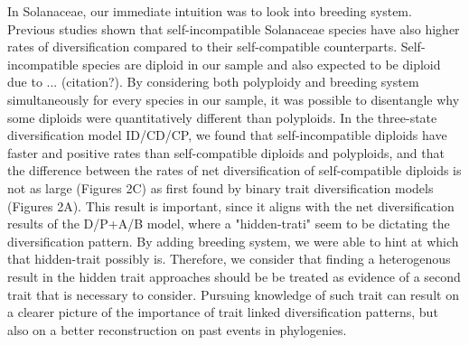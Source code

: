 In Solanaceae, our immediate intuition was to look into breeding system. Previous studies shown that self-incompatible Solanaceae species have also higher rates of diversification compared to their self-compatible counterparts. Self-incompatible species are diploid in our sample and also expected to be diploid due to ... (citation?). By considering both polyploidy and breeding system simultaneously for every species in our sample, it was possible to disentangle why some diploids were quantitatively different than polyploids. In the three-state diversification model ID/CD/CP, we found that self-incompatible diploids have faster and positive rates than self-compatible diploids and polyploids, and that the difference between the  rates of net diversification of self-compatible diploids is not as large (Figures 2C) as first found by binary trait diversification models (Figures 2A). This result is important, since it aligns with the net diversification results of the  D/P+A/B model, where a "hidden-trati" seem to be dictating the diversification pattern. By adding breeding system, we were able to hint at which that hidden-trait possibly is. Therefore, we consider that finding a heterogenous result in the hidden trait approaches should be be treated as evidence of a second trait that is necessary to consider. Pursuing knowledge of  such trait can result on a clearer picture of the importance of trait linked diversification patterns, but also on a better reconstruction on past events in phylogenies.







%
